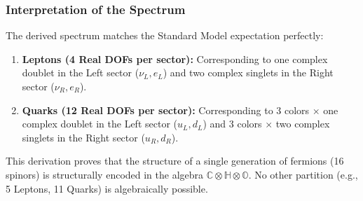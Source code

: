 \subsubsection{Interpretation of the Spectrum}
The derived spectrum matches the Standard Model expectation perfectly:
\begin{enumerate}
    \item \textbf{Leptons (4 Real DOFs per sector):} Corresponding to one complex doublet in the Left sector ($\nu_L, e_L$) and two complex singlets in the Right sector ($\nu_R, e_R$).
    \item \textbf{Quarks (12 Real DOFs per sector):} Corresponding to 3 colors $\times$ one complex doublet in the Left sector ($u_L, d_L$) and 3 colors $\times$ two complex singlets in the Right sector ($u_R, d_R$).
\end{enumerate}
This derivation proves that the structure of a single generation of fermions (16 spinors) is structurally encoded in the algebra $\mathbb{C} \otimes \mathbb{H} \otimes \mathbb{O}$. No other partition (e.g., 5 Leptons, 11 Quarks) is algebraically possible.

